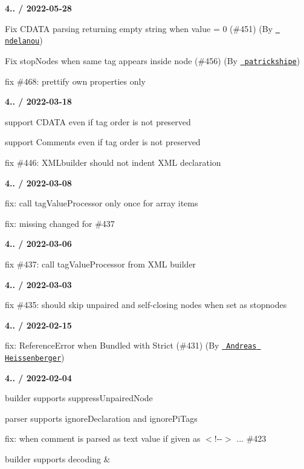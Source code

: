 {\bfseries{4.. / 2022-\/05-\/28}}
\begin{DoxyItemize}
\item Fix CDATA parsing returning empty string when value = 0 (\#451) (By \href{https://github.com/ndelanou}{\texttt{ ndelanou}})
\item Fix stop\+Nodes when same tag appears inside node (\#456) (By \href{https://github.com/patrickshipe}{\texttt{ patrickshipe}})
\item fix \#468\+: prettify own properties only
\end{DoxyItemize}

{\bfseries{4.. / 2022-\/03-\/18}}
\begin{DoxyItemize}
\item support CDATA even if tag order is not preserved
\item support Comments even if tag order is not preserved
\item fix \#446\+: XMLbuilder should not indent XML declaration
\end{DoxyItemize}

{\bfseries{4.. / 2022-\/03-\/08}}
\begin{DoxyItemize}
\item fix\+: call tag\+Value\+Processor only once for array items
\item fix\+: missing changed for \#437
\end{DoxyItemize}

{\bfseries{4.. / 2022-\/03-\/06}}
\begin{DoxyItemize}
\item fix \#437\+: call tag\+Value\+Processor from XML builder
\end{DoxyItemize}

{\bfseries{4.. / 2022-\/03-\/03}}
\begin{DoxyItemize}
\item fix \#435\+: should skip unpaired and self-\/closing nodes when set as stopnodes
\end{DoxyItemize}

{\bfseries{4.. / 2022-\/02-\/15}}
\begin{DoxyItemize}
\item fix\+: Reference\+Error when Bundled with Strict (\#431) (By \href{https://github.com/aheissenberger}{\texttt{ Andreas Heissenberger}})
\end{DoxyItemize}

{\bfseries{4.. / 2022-\/02-\/04}}
\begin{DoxyItemize}
\item builder supports {\ttfamily suppress\+Unpaired\+Node}
\item parser supports {\ttfamily ignore\+Declaration} and {\ttfamily ignore\+Pi\+Tags}
\item fix\+: when comment is parsed as text value if given as {\ttfamily \texorpdfstring{$<$}{<}!-\/-\/\texorpdfstring{$>$}{>} ...} \#423
\item builder supports decoding {\ttfamily \&}
\end{DoxyItemize}

